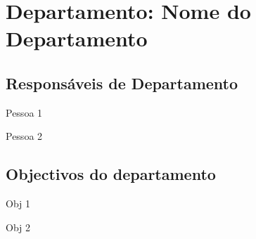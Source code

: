 \section{Departamento: Nome do Departamento}

\subsection{Responsáveis de Departamento}
\begin{itemizedash}
	\item Pessoa 1
	\item Pessoa 2
\end{itemizedash}

\subsection{Objectivos do departamento}
\lipsum[2]
\begin{itemizedash}
	\item Obj 1
	\item Obj 2
\end{itemizedash}
